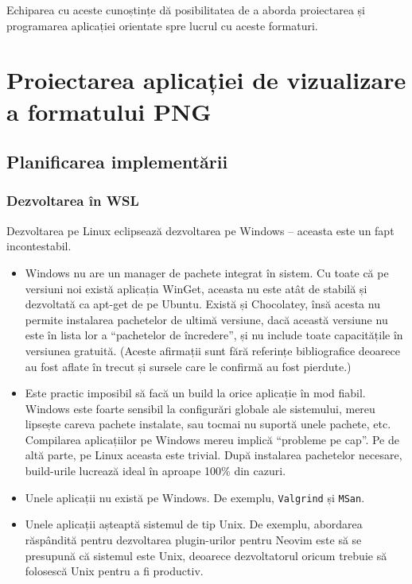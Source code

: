 \documentclass[a4paper,12pt]{report}
\begin{document}
Echiparea cu aceste cunoștințe dă posibilitatea de a aborda proiectarea
și programarea aplicației orientate spre lucrul cu aceste formaturi.


\chapter{Proiectarea aplicației de vizualizare a formatului \acs{PNG}}\label{architecture_chapter_title}

\section{Planificarea implementării}

\subsection{Dezvoltarea în \acs{WSL}}

Dezvoltarea pe Linux eclipsează dezvoltarea pe Windows -- aceasta este un fapt incontestabil.
\begin{itemize}
    \item 
        Windows nu are un manager de pachete integrat în sistem.
        Cu toate că pe versiuni noi există aplicația WinGet, 
        aceasta nu este atât de stabilă și dezvoltată ca apt-get de pe Ubuntu.
        Există și Chocolatey, însă acesta nu permite instalarea pachetelor de ultimă versiune,
        dacă această versiune nu este în lista lor a ``pachetelor de încredere'',
        și nu include toate capacitățile în versiunea gratuită.
        (Aceste afirmații sunt fără referințe bibliografice deoarece 
        au fost aflate în trecut și sursele care le confirmă au fost pierdute.)

    \item
        Este practic imposibil să facă un build la orice aplicație în mod fiabil.
        Windows este foarte sensibil la configurări globale ale sistemului,
        mereu lipsește careva pachete instalate, sau tocmai nu suportă unele pachete, etc.
        Compilarea aplicațiilor pe Windows mereu implică ``probleme pe cap''.
        Pe de altă parte, pe Linux aceasta este trivial.
        După instalarea pachetelor necesare, build-urile lucrează ideal în aproape 100\% din cazuri.

    \item
        Unele aplicații nu există pe Windows.
        De exemplu, \texttt{Valgrind} și \texttt{MSan}.

    \item
        Unele aplicații așteaptă sistemul de tip Unix.
        De exemplu, abordarea răspândită pentru dezvoltarea plugin-urilor
        pentru Neovim este să se presupună că sistemul este Unix,
        deoarece dezvoltatorul oricum trebuie să folosescă Unix pentru a fi productiv.
\end{itemize}
\end{document}
